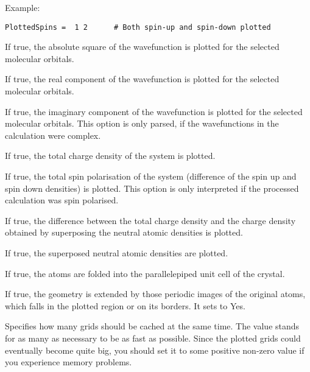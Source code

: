 \begin{description}
Example:
\begin{verbatim}
PlottedSpins =  1 2      # Both spin-up and spin-down plotted
\end{verbatim}

\item[\is{ChargeDensity}] If true, the absolute square of the
  wavefunction is plotted for the selected molecular orbitals.

\item[\is{RealComponent}] If true, the real component of the
  wavefunction is plotted for the selected molecular orbitals.

\item[\is{ImagComponent}] If true, the imaginary component of the
  wavefunction is plotted for the selected molecular orbitals. This
  option is only parsed, if the wavefunctions in the \dftbp{}
  calculation were complex.

\item[\is{TotalChargeDensity}] If true, the total charge density of
  the system is plotted.

\item[\is{TotalSpinPolarisation}] If true, the total spin polarisation of
  the system (difference of the spin up and spin down densities) is
  plotted. This option is only interpreted if the processed \dftbp{}
  calculation was spin polarised.

\item[\is{TotalChargeDifference}] If true, the difference between the
  total charge density and the charge density obtained by superposing
  the neutral atomic densities is plotted.

\item[\is{TotalAtomicDensity}] If true, the superposed neutral atomic
  densities are plotted.

\item[\is{FoldAtomsToUnitCell}] If true, the atoms are folded into the
  parallelepiped unit cell of the crystal.

\item[\is{FillBoxWithAtoms}] If true, the geometry is extended by those
  periodic images of the original atoms, which falls in the plotted
  region or on its borders.  It sets  to Yes.

\item[\is{NrOfCachedGrids}] Specifies how many grids should be cached
  at the same time. The value  stands for as many as necessary
  to be as fast as possible. Since the plotted grids could eventually
  become quite big, you should set it to some positive non-zero value
  if you experience memory problems.


\end{description}
